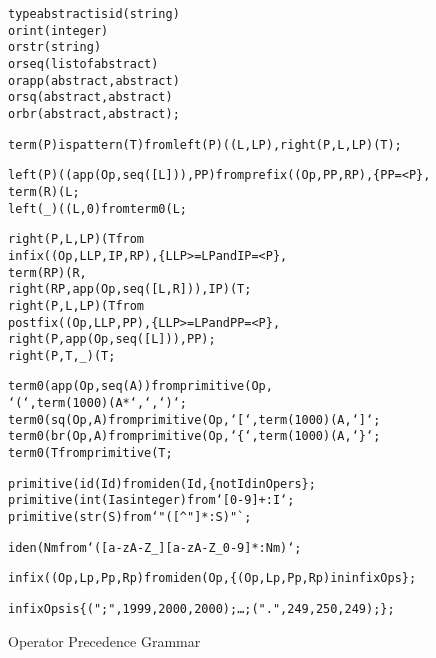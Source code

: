 \begin{program}
\begin{alltt}
type abstract is id(string)
  or int(integer)
  or str(string)
  or seq(list of abstract)
  or app(abstract,abstract)
  or sq(abstract,abstract)
  or br(abstract,abstract);

term(P) is pattern(T) from left(P)((L,LP), right(P,L,LP)(T);

left(P)((app(Op,seq([L])),PP) from prefix((Op,PP,RP), \{PP=<P\},
       term(R)(L;
left(_)((L,0) from term0(L;

right(P,L,LP)(T from 
       infix((Op,LLP,IP,RP), \{ LLP>=LP and IP=<P \},
       term(RP)(R,
       right(RP,app(Op,seq([L,R])),IP)(T;
right(P,L,LP)(T from    
       postfix((Op,LLP,PP), \{ LLP>=LP and PP=<P \},
       right(P,app(Op,seq([L])),PP);
right(P,T,_)(T;

term0(app(Op,seq(A)) from primitive(Op, 
       `(`, term(1000)(A * `,`, `)`;
term0(sq(Op,A) from primitive(Op, `[`, term(1000)(A, `]`;
term0(br(Op,A) from primitive(Op, `\{`, term(1000)(A, `\}`;
term0(T from primitive(T;

primitive(id(Id) from iden(Id, \{not Id in Opers\};
primitive(int(I as integer) from `[0-9]+:I`;
primitive(str(S) from `"([^"]*:S)"`;

iden(Nm from `([a-zA-Z_][a-zA-Z_0-9]*:Nm)`;

infix((Op,Lp,Pp,Rp) from iden(Op, \{(Op,Lp,Pp,Rp) in infixOps \};

infixOps is \{ (";",1999,2000,2000); \ldots; (".",249,250,249); \};
\end{alltt}
\vspace{-2ex}
\caption{Operator Precedence Grammar}\label{srOpPrecGrammar}
\end{program}